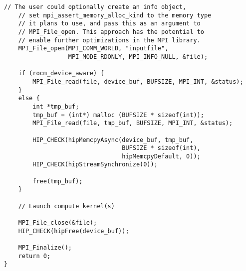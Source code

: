 \begin{example}
\begin{lstlisting}[language={[MPI]C}]
    // The user could optionally create an info object,
    // set mpi_assert_memory_alloc_kind to the memory type
    // it plans to use, and pass this as an argument to
    // MPI_File_open. This approach has the potential to
    // enable further optimizations in the MPI library.
    MPI_File_open(MPI_COMM_WORLD, "inputfile",
                  MPI_MODE_RDONLY, MPI_INFO_NULL, &file);

    if (rocm_device_aware) {
        MPI_File_read(file, device_buf, BUFSIZE, MPI_INT, &status);
    }
    else {
        int *tmp_buf;
        tmp_buf = (int*) malloc (BUFSIZE * sizeof(int));
        MPI_File_read(file, tmp_buf, BUFSIZE, MPI_INT, &status);

        HIP_CHECK(hipMemcpyAsync(device_buf, tmp_buf,
                                 BUFSIZE * sizeof(int),
                                 hipMemcpyDefault, 0));
        HIP_CHECK(hipStreamSynchronize(0));

        free(tmp_buf);
    }

    // Launch compute kernel(s)

    MPI_File_close(&file);
    HIP_CHECK(hipFree(device_buf));

    MPI_Finalize();
    return 0;
}
\end{lstlisting}
\end{example}
